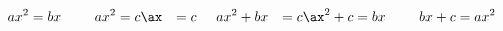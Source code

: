 \documentclass[preview]{standalone}
\begin{document}
\begin{align*}
ax^2   &= bx        \hspace{0.5cm}&         ax^2    &= c    \ax     &= c         \hspace{0.5cm}&         ax^2+bx &= c    \ax^2+c &= bx        \hspace{0.5cm}&         bx+c    &= ax^2
\end{align*}
\end{document}
